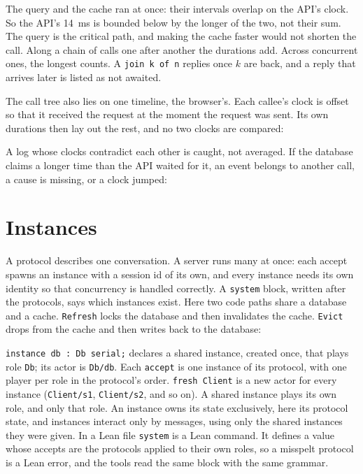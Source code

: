 \begin{center}
\small

\end{center}



The query and the cache ran at once: their intervals overlap on the API's clock.
So the API's 14~ms is bounded below by the longer of the two, not their sum. The
query is the critical path, and making the cache faster would not shorten the
call. Along a chain of calls one after another the durations add. Across
concurrent ones, the longest counts. A \texttt{join k of n} replies once $k$ are
back, and a reply that arrives later is listed as not awaited.

The call tree also lies on one timeline, the browser's. Each callee's clock is
offset so that it received the request at the moment the request was sent. Its
own durations then lay out the rest, and no two clocks are compared:



A log whose clocks contradict each other is caught, not averaged. If the
database claims a longer time than the API waited for it, an event belongs to
another call, a cause is missing, or a clock jumped:



\section{Instances}
\label{sec:instances}

A protocol describes one conversation. A server runs many at once: each accept
spawns an instance with a session id of its own, and every instance needs its own
identity so that concurrency is handled correctly. A \texttt{system} block, written
after the protocols, says which instances exist. Here two code paths share a
database and a cache. \texttt{Refresh} locks the database and then invalidates
the cache. \texttt{Evict} drops from the cache and then writes back to the
database:



\texttt{instance db : Db serial;} declares a shared instance, created once, that
plays role \texttt{Db}; its actor is \texttt{Db/db}. Each \texttt{accept} is one
instance of its protocol, with one player per role in the protocol's order.
\texttt{fresh Client} is a new actor for every instance (\texttt{Client/s1},
\texttt{Client/s2}, and so on). A shared instance plays its own role, and only
that role. An instance owns its state exclusively, here its protocol state, and
instances interact only by messages, using only the shared instances they were
given. In a Lean file \texttt{system} is a Lean command. It defines a value whose
accepts are the protocols applied to their own roles, so a misspelt protocol is a
Lean error, and the tools read the same block with the same grammar.


